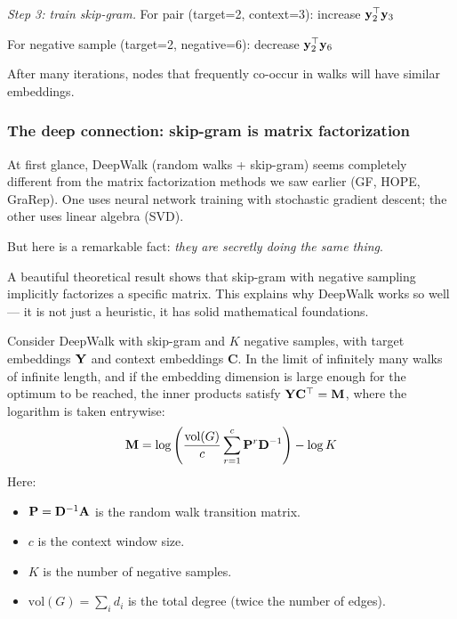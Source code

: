 \begin{notechapter}
\begin{example}
\emph{Step 3: train skip-gram.}
For pair (target=2, context=3): increase $\mathbf{y}_2^\top \mathbf{y}_3$

For negative sample (target=2, negative=6): decrease $\mathbf{y}_2^\top \mathbf{y}_6$

After many iterations, nodes that frequently co-occur in walks will have similar embeddings.
\end{example}

\subsubsection*{The deep connection: skip-gram is matrix factorization}

At first glance, DeepWalk (random walks + skip-gram) seems completely different from the matrix factorization methods we saw earlier (GF, HOPE, GraRep). One uses neural network training with stochastic gradient descent; the other uses linear algebra (SVD).

\begin{intuition}[Motivation]
But here is a remarkable fact: \emph{they are secretly doing the same thing}.

A beautiful theoretical result shows that skip-gram with negative sampling implicitly factorizes a specific matrix. This explains why DeepWalk works so well --- it is not just a heuristic, it has solid mathematical foundations.
\end{intuition}

\begin{theorem}
Consider DeepWalk with skip-gram and $K$ negative samples, with target embeddings $\mathbf{Y}$ and context embeddings $\mathbf C$. In the limit of infinitely many walks of infinite length, and if the embedding dimension is large enough for the optimum to be reached, the inner products satisfy $\mathbf{Y}\mathbf C^\top = \mathbf M$, where the logarithm is taken entrywise:
\[
\mathbf{M} = \log\left(\frac{\text{vol}(G)}{c} \sum_{r=1}^{c} \mathbf{P}^r \mathbf{D}^{-1}\right) - \log K
\]
Here:
\begin{itemize}
    \item $\mathbf{P} = \mathbf{D}^{-1}\mathbf{A}$ is the random walk transition matrix.
    \item $c$ is the context window size.
    \item $K$ is the number of negative samples.
    \item $\text{vol}(G) = \sum_i d_i$ is the total degree (twice the number of edges).
\end{itemize}
\end{theorem}


\end{notechapter}
